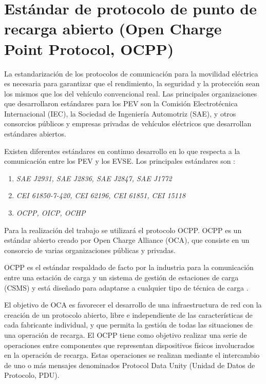 \documentclass[12pt,a4paper,onecolumn,oneside]{report}
\begin{document}
\section{Estándar de protocolo de punto de recarga abierto (Open Charge Point Protocol, OCPP)}
\label{Estándar de protocolo de punto de recarga abierto (Open Charge Point Protocol, OCPP)}

La estandarización de los protocolos de comunicación para la movilidad eléctrica es necesaria para garantizar que el rendimiento, la seguridad y la protección sean los mismos que los del vehículo convencional real. Las principales organizaciones que desarrollaron estándares para los PEV son la Comisión Electrotécnica Internacional (IEC), la Sociedad de Ingeniería Automotriz (SAE), y otros consorcios públicos y empresas privadas de vehículos eléctricos que desarrollan estándares abiertos.

Existen diferentes estándares en continuo desarrollo en lo que respecta a la comunicación entre los PEV y los EVSE. Los principales estándares son \cite{quinceuno}\cite{quincedos}:

\begin{enumerate}

\item \textit{SAE J2931, SAE J2836, SAE J2847, SAE J1772}
\item \textit{CEI 61850-7-420, CEI 62196, CEI 61851, CEI 15118}
\item \textit{OCPP, OICP, OCHP}

\end{enumerate}

Para la realización del trabajo se utilizará el protocolo OCPP. OCPP \cite{quincedos}\cite{quincetres} es un estándar abierto creado por Open Charge Alliance (OCA), que consiste en un consorcio de varias organizaciones públicas y privadas.

OCPP es el estándar respaldado de facto por la industria para la comunicación entre una estación de carga y un sistema de gestión de estaciones de carga (CSMS) y está diseñado para adaptarse a cualquier tipo de técnica de carga \cite{quincetres}.

El objetivo de OCA es favorecer el desarrollo de una infraestructura de red con la creación de un protocolo abierto, libre e independiente de las características de cada fabricante individual, y que permita la gestión de todas las situaciones de una operación de recarga. El OCPP tiene como objetivo realizar una serie de operaciones entre componentes que representan dispositivos físicos involucrados en la operación de recarga. Estas operaciones se realizan mediante el intercambio de uno o más mensajes denominados Protocol Data Unity (Unidad de Datos de Protocolo, PDU).
\end{document}
